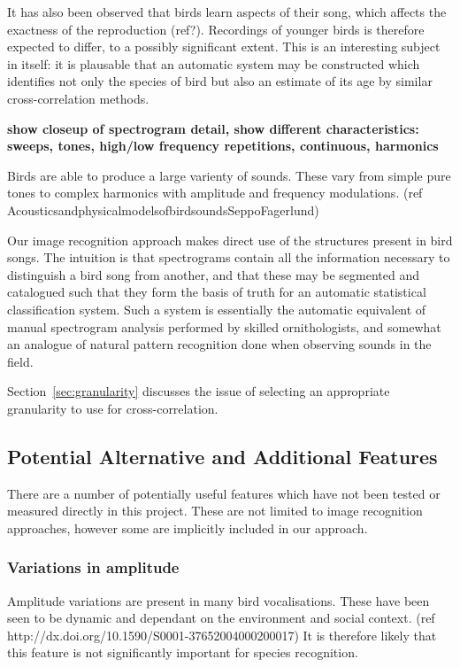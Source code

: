 It has also been observed that birds learn aspects of their song, which affects
the exactness of the reproduction (ref?).
Recordings of younger birds is therefore expected to differ, to a possibly
significant extent.
This is an interesting subject in itself: it is plausable that an automatic
system may be constructed which identifies not only the species of bird but also
an estimate of its age by similar cross-correlation methods.

\textbf{show closeup of spectrogram detail, show different characteristics:
sweeps, tones, high/low frequency repetitions, continuous, harmonics}

Birds are able to produce a large varienty of sounds.
These vary from simple pure tones to complex harmonics with amplitude and
frequency modulations. (ref AcousticsandphysicalmodelsofbirdsoundsSeppoFagerlund)

Our image recognition approach makes direct use of the structures present
in bird songs.
The intuition is that spectrograms contain all the information necessary to
distinguish a bird song from another, and that these may be segmented and
catalogued such that they form the basis of truth for an automatic statistical
classification system.
Such a system is essentially the automatic equivalent of manual spectrogram 
analysis performed by skilled ornithologists, and somewhat an analogue of natural
pattern recognition done when observing sounds in the field.

Section~\ref{sec:granularity} discusses the issue of selecting an appropriate
granularity to use for cross-correlation.

\subsection{Potential Alternative and Additional Features}
There are a number of potentially useful features which have not been tested or
measured directly in this project.
These are not limited to image recognition approaches, however some are
implicitly included in our approach.

\subsubsection{Variations in amplitude}
Amplitude variations are present in many bird vocalisations.
These have been seen to be dynamic and dependant on the environment and social
context. (ref http://dx.doi.org/10.1590/S0001-37652004000200017)
It is therefore likely that this feature is not significantly important for
species recognition.

